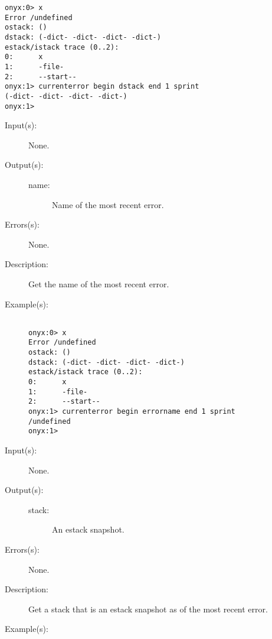 \begin{description}
\begin{description}
\begin{verbatim}
onyx:0> x
Error /undefined
ostack: ()
dstack: (-dict- -dict- -dict- -dict-)
estack/istack trace (0..2):
0:      x
1:      -file-
2:      --start--
onyx:1> currenterror begin dstack end 1 sprint
(-dict- -dict- -dict- -dict-)
onyx:1>
		\end{verbatim}
	\end{description}
\label{currenterror:errorname}
\item[{\onyxop{--}{errorname}{name}}: ]
	\begin{description}\item[]
	\item[Input(s): ] None.
	\item[Output(s): ]
		\begin{description}\item[]
		\item[name: ]
			Name of the most recent error.
		\end{description}
	\item[Errors(s): ] None.
	\item[Description: ]
		Get the name of the most recent error.
	\item[Example(s): ]\begin{verbatim}

onyx:0> x
Error /undefined
ostack: ()
dstack: (-dict- -dict- -dict- -dict-)
estack/istack trace (0..2):
0:      x
1:      -file-
2:      --start--
onyx:1> currenterror begin errorname end 1 sprint
/undefined
onyx:1>
		\end{verbatim}
	\end{description}
\label{currenterror:estack}
\item[{\onyxop{--}{estack}{stack}}: ]
	\begin{description}\item[]
	\item[Input(s): ] None.
	\item[Output(s): ]
		\begin{description}\item[]
		\item[stack: ]
			An estack snapshot.
		\end{description}
	\item[Errors(s): ] None.
	\item[Description: ]
		Get a stack that is an estack snapshot as of the most recent
		error.
	\item[Example(s): ]\begin{verbatim}


\end{verbatim}
\end{description}
\end{description}

